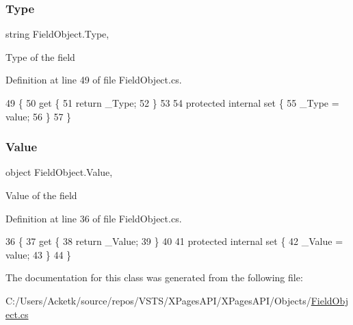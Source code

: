 \subsubsection{\texorpdfstring{Type}{Type}}
{\footnotesize\ttfamily string Field\+Object.\+Type\hspace{0.3cm}{\ttfamily [get]}, {\ttfamily [set]}}



Type of the field 



Definition at line 49 of file Field\+Object.\+cs.


\begin{DoxyCode}
49                        \{
50         \textcolor{keyword}{get} \{
51             \textcolor{keywordflow}{return} \_Type;
52         \}
53 
54         \textcolor{keyword}{protected} \textcolor{keyword}{internal} \textcolor{keyword}{set} \{
55             \_Type = value;
56         \}
57     \}
\end{DoxyCode}
\mbox{\label{class_field_object_a9764fb1824cec95b82cd6ac0b4cd8919}} 
\subsubsection{\texorpdfstring{Value}{Value}}
{\footnotesize\ttfamily object Field\+Object.\+Value\hspace{0.3cm}{\ttfamily [get]}, {\ttfamily [set]}}



Value of the field 



Definition at line 36 of file Field\+Object.\+cs.


\begin{DoxyCode}
36                         \{
37         \textcolor{keyword}{get} \{
38             \textcolor{keywordflow}{return} \_Value;
39         \}
40 
41         \textcolor{keyword}{protected} \textcolor{keyword}{internal} \textcolor{keyword}{set} \{
42             \_Value = value;
43         \}
44     \}
\end{DoxyCode}


The documentation for this class was generated from the following file\+:\begin{DoxyCompactItemize}
\item 
C\+:/\+Users/\+Acketk/source/repos/\+V\+S\+T\+S/\+X\+Pages\+A\+P\+I/\+X\+Pages\+A\+P\+I/\+Objects/\mbox{\hyperlink{_field_object_8cs}{Field\+Object.\+cs}}\end{DoxyCompactItemize}
